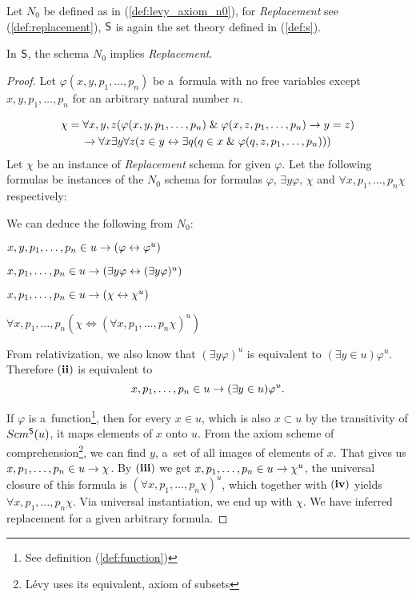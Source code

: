 Let $N_0$ be defined as in (\ref{def:levy_axiom_n0}), for \emph{Replacement} see (\ref{def:replacement}), $\sf{S}$ is again the set theory defined in (\ref{def:s}).
\begin{theorem}
In $\sf{S}$, the schema $N_0$ implies \emph{Replacement}.
\end{theorem}

\begin{proof}
Let $\varphi(x, y, p_1, \ldots, p_n)$ be a~formula with no free variables except $x, y, p_1, \ldots, p_n$ for an arbitrary natural number $n$.

\begin{equation}
\begin{gathered}
\chi = \forall x, y, z(\varphi(x, y, p_1, \ldots, p_n) \mathrel{\&} \varphi(x, z, p_1, \ldots, p_n) \rightarrow y = z) \\
\rightarrow \forall x \exists y \forall z (z \in y \leftrightarrow \exists q (q \in x \mathrel{\&} \varphi(q, z, p_1, \ldots, p_n)))
\end{gathered}
\end{equation}
Let $\chi$ be an instance of \emph{Replacement} schema for given $\varphi$. Let the following formulas be instances of the $N_0$ schema for formulas  $\varphi$, $\exists y \varphi$, $\chi$ and $\forall x, p_1, \ldots, p_n \chi$ respectively:

We can deduce the following from $N_0$: 
\bce[(i)]
\item $x, y, p_1, \ldots, p_n \in u \rightarrow (\varphi \leftrightarrow \varphi^{u}) $
\item $x, p_1, \ldots, p_n \in u \rightarrow (\exists y \varphi \leftrightarrow (\exists y \varphi)^{u})$
\item $x, p_1, \ldots, p_n \in u \rightarrow (\chi \leftrightarrow \chi^{u})$
\item $\forall x, p_1, \ldots, p_n (\chi \iff (\forall x, p_1, \ldots, p_n \chi)^{u})$
\ece

From relativization, we also know that $(\exists y \varphi)^{u}$ is equivalent to $(\exists y \in u) \varphi^{u}$.
Therefore $\bold{(ii)}$ is equivalent to
\begin{equation}
x, p_1, \ldots, p_n \in u \rightarrow (\exists y \in u) \varphi^{u}. 
\end{equation}

If $\varphi$ is a~function\footnote{See definition (\ref{def:function})}, then for every $x \in u$, which is also $x \subset u$ by the transitivity of $Scm^{\sf{S}}(u)$,
it maps elements of $x$ onto $u$. From the axiom scheme of comprehension\footnote{Lévy uses its equivalent, axiom of subsets}, we can find $y$, a~set of all images of elements of $x$.
That gives us $x, p_1, \ldots, p_n \in u \rightarrow \chi$. By $\bold{(iii)}$ we get $x, p_1, \ldots, p_n \in u \rightarrow \chi^{u}$, the universal closure of this formula is $(\forall x, p_1, \ldots, p_n \chi)^{u}$, 
which together with $\bold{(iv)}$ yields $\forall x, p_1, \ldots, p_n \chi$. Via universal instantiation, we end up with $\chi$. We have inferred replacement for a given arbitrary formula. 
\end{proof}

